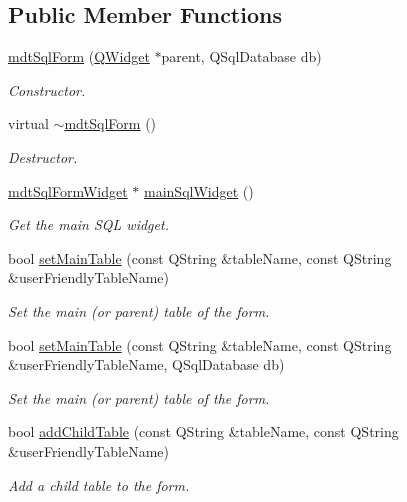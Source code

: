 \subsection*{Public Member Functions}
\begin{DoxyCompactItemize}
\item 
\hyperlink{classmdt_sql_form_a607993f0d35207668c0f220d77bd9298}{mdt\-Sql\-Form} (\hyperlink{class_q_widget}{Q\-Widget} $\ast$parent, Q\-Sql\-Database db)
\begin{DoxyCompactList}\small\item\em Constructor. \end{DoxyCompactList}\item 
virtual \hyperlink{classmdt_sql_form_ab4538979323566433a20bb71118525a5}{$\sim$mdt\-Sql\-Form} ()
\begin{DoxyCompactList}\small\item\em Destructor. \end{DoxyCompactList}\item 
\hyperlink{classmdt_sql_form_widget}{mdt\-Sql\-Form\-Widget} $\ast$ \hyperlink{classmdt_sql_form_a857fc9370e2054408ae8b42e8deedbf5}{main\-Sql\-Widget} ()
\begin{DoxyCompactList}\small\item\em Get the main S\-Q\-L widget. \end{DoxyCompactList}\item 
bool \hyperlink{classmdt_sql_form_ab03dd80e9de62362dd77161ef6bd6fc2}{set\-Main\-Table} (const Q\-String \&table\-Name, const Q\-String \&user\-Friendly\-Table\-Name)
\begin{DoxyCompactList}\small\item\em Set the main (or parent) table of the form. \end{DoxyCompactList}\item 
bool \hyperlink{classmdt_sql_form_ac2de4ee6f27d7411c2404771585204ae}{set\-Main\-Table} (const Q\-String \&table\-Name, const Q\-String \&user\-Friendly\-Table\-Name, Q\-Sql\-Database db)
\begin{DoxyCompactList}\small\item\em Set the main (or parent) table of the form. \end{DoxyCompactList}\item 
bool \hyperlink{classmdt_sql_form_a3504a54f26777ed38efce5cc151a1dbf}{add\-Child\-Table} (const Q\-String \&table\-Name, const Q\-String \&user\-Friendly\-Table\-Name)
\begin{DoxyCompactList}\small\item\em Add a child table to the form. \end{DoxyCompactList}\item 

\end{DoxyCompactItemize}
